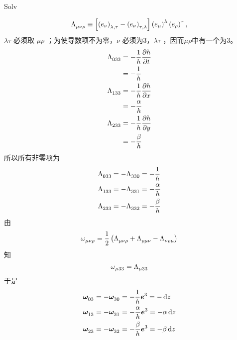 \begin{xiti}
\begin{jie}
\begin{enumerate}
\begin{yl}{Solv}
\begin{enumerate}[leftmargin=2em]
\begin{displaymath}
            		\tensor{\Lambda}{_\mu_\nu_\rho} \equiv \left[ \tensor{\left(e_\nu\right)}{_{\lambda,\tau}} - \tensor{\left(e_\nu\right)}{_{\tau,\lambda}} \right] \tensor{\left(e_\mu\right)}{^\lambda} \tensor{\left(e_\rho\right)}{^\tau},
            		\end{displaymath}
            		$\lambda\tau$ 必须取 $\mu\rho$ ；为使导数项不为零，$\nu$ 必须为3，$\lambda\tau$ ，因而$\mu\rho$中有一个为3。
            		\begin{align*}
            		\tensor{\Lambda}{_0_3_3} &= - \frac{1}{h} \pdv{h}{t}\\
            		&= -\frac{1}{h}\\
            		\tensor{\Lambda}{_1_3_3} &= - \frac{1}{h} \pdv{h}{x}\\
            		&= -\frac{\alpha}{h}\\
            		\tensor{\Lambda}{_2_3_3} &= - \frac{1}{h} \pdv{h}{y} \\
            		&= - \frac{\beta}{h}
            		\end{align*}
            		所以所有非零项为
            		\begin{align*}
            		\tensor{\Lambda}{_0_3_3} = - \tensor{\Lambda}{_3_3_0} &= - \frac{1}{h}\\
            		\tensor{\Lambda}{_1_3_3} = - \tensor{\Lambda}{_3_3_1} &= - \frac{\alpha}{h}\\
            		\tensor{\Lambda}{_2_3_3} = - \tensor{\Lambda}{_3_3_2} &= - \frac{\beta}{h}
            		\end{align*}
            		由
            		\begin{displaymath}
            		\tensor{\omega}{_\mu_\nu_\rho} = \frac{1}{2} \left( \tensor{\Lambda}{_\mu_\nu_\rho} + \tensor{\Lambda}{_\rho_\mu_\nu} - \tensor{\Lambda}{_\nu_\rho_\mu} \right)
            		\end{displaymath}
            		知
            		\begin{displaymath}
            		\tensor{\omega}{_\mu_3_3} = \tensor{\Lambda}{_\mu_3_3}
            		\end{displaymath}
            		于是
            		\begin{align*}
            		\tensor{\bm{\omega}}{_0_3} = - \tensor{\bm{\omega}}{_3_0} &= - \frac{1}{h} \bm{e}^3 = - \dd{z}\\
            		\tensor{\bm{\omega}}{_1_3} = - \tensor{\bm{\omega}}{_3_1} &= - \frac{\alpha}{h} \bm{e}^3 = - \alpha \dd{z}\\
            		\tensor{\bm{\omega}}{_2_3} = - \tensor{\bm{\omega}}{_3_2} &= - \frac{\beta}{h} \bm{e}^3 = - \beta \dd{z}

\end{align*}
\end{enumerate}
\end{yl}
\end{enumerate}
\end{jie}
\end{xiti}
